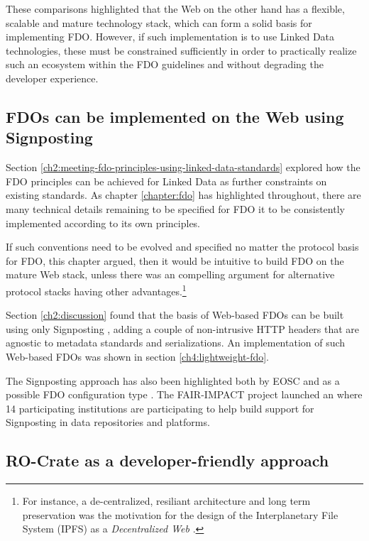 These comparisons highlighted that the Web on the other hand has a flexible, scalable and mature technology stack, which can form a solid basis for implementing FDO. 
However, if such implementation is to use Linked Data technologies, these must be constrained sufficiently in order to practically realize such an ecosystem within the FDO guidelines and without degrading the developer experience.


\subsection{FDOs can be implemented on the Web using Signposting}\label{ch60:signposting}

Section \vref{ch2:meeting-fdo-principles-using-linked-data-standards} explored how the FDO principles can be achieved for Linked Data as further constraints on existing standards.
As chapter \ref{chapter:fdo} has highlighted throughout, there are many technical details remaining to be specified for FDO it to be consistently implemented according to its own principles.

If such conventions need to be evolved and specified no matter the protocol basis for FDO, this chapter argued, then it would be intuitive to build FDO on the mature Web stack, unless there was an compelling argument for alternative protocol stacks having other advantages.\footnote{
  For instance, a de-centralized, resiliant architecture and long term preservation was the motivation for the design of the Interplanetary File System (IPFS) as a \emph{Decentralized Web} \cite{Trautwein 2022}.
}

Section \ref{ch2:discussion} found that the basis of Web-based FDOs can be built using only Signposting \cite{vandesompel2015,Van de Sompel 2022}, adding a couple of non-intrusive HTTP headers that are agnostic to metadata standards and serializations. An implementation of such Web-based FDOs was shown in section \ref{ch4:lightweight-fdo}. 

The Signposting approach has also been highlighted both by EOSC \cite{10.5281/zenodo.7463421} and as a possible FDO configuration type \cite{fdo-ConfigurationTypes}.
The FAIR-IMPACT project launched an  where 14 participating institutions are participating to help build support for Signposting \cite{soilandreyes2023b} in data repositories and platforms.



\subsection{RO-Crate as a developer-friendly approach}

